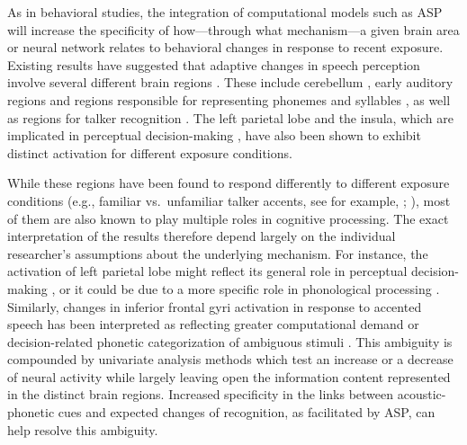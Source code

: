\documentclass[
  11pt,
  man,floatsintext]{apa6}
\begin{document}
As in behavioral studies, the integration of computational models such as ASP will increase the specificity of how---through what mechanism---a given brain area or neural network relates to behavioral changes in response to recent exposure. Existing results have suggested that adaptive changes in speech perception involve several different brain regions \autocite{luthra2020a}. These include cerebellum \autocite{guediche2014}, early auditory regions \autocites[anterior planum temporale,][]{kilianhutten2011,bonte2017} and regions responsible for representing phonemes and syllables \autocites[e.g., posterior superior temporal gyri/superior temporal sulcus,][]{bonte2017,myers-mesite2014,ullas2020}, as well as regions for talker recognition \autocite[right temporal regions,][]{luthra2020b}. The left parietal lobe and the insula, which are implicated in perceptual decision-making \autocites[e.g.,][]{dacremont2013,keuken2014}, have also been shown to exhibit distinct activation for different exposure conditions.

While these regions have been found to respond differently to different exposure conditions (e.g., familiar vs.~unfamiliar talker accents, see for example, \textcite{adank2012neural}; \textcite{holmes2021speech}), most of them are also known to play multiple roles in cognitive processing. The exact interpretation of the results therefore depend largely on the individual researcher's assumptions about the underlying mechanism. For instance, the activation of left parietal lobe might reflect its general role in perceptual decision-making \autocites[e.g.,][]{dacremont2013,keuken2014}, or it could be due to a more specific role in phonological processing \autocite[e.g., processing abstract category information,][]{guediche2014}. Similarly, changes in inferior frontal gyri activation in response to accented speech has been interpreted as reflecting greater computational demand \autocite{yi2014neural} or decision-related phonetic categorization of ambiguous stimuli \autocite{myers-mesite2014}. This ambiguity is compounded by univariate analysis methods which test an increase or a decrease of neural activity while largely leaving open the information content represented in the distinct brain regions. Increased specificity in the links between acoustic-phonetic cues and expected changes of recognition, as facilitated by ASP, can help resolve this ambiguity.
\end{document}
